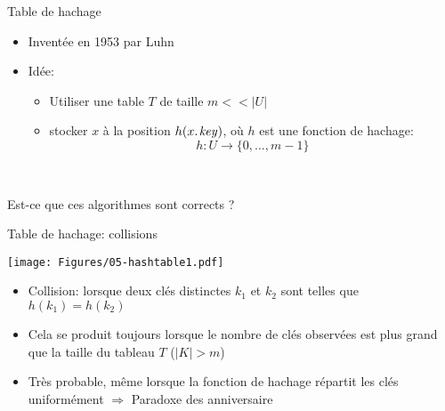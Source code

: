 \begin{frame}{Table de hachage}

\begin{itemize}
\item Inventée en 1953 par Luhn
\item Idée:
\begin{itemize}
\item Utiliser une table $T$ de taille $m<<|U|$
\item stocker $x$ à la position $h(\attrib{x}{key})$, où $h$ est une fonction de \alert{hachage}: $$h:U\rightarrow \{0,\ldots,m-1\}$$
\end{itemize}
\end{itemize}

\begin{center}
\begin{small}
~~~~~~~~

\bigskip

\end{small}
\end{center}

Est-ce que ces algorithmes sont corrects ?

\end{frame}

\begin{frame}{Table de hachage: collisions}

\centerline{\texttt{[image: Figures/05-hashtable1.pdf]}}

\bigskip

\begin{itemize}
\item \alert{Collision:} lorsque deux clés distinctes $k_1$ et $k_2$ sont telles que $h(k_1)=h(k_2)$
\item Cela se produit toujours lorsque le nombre de clés observées est plus grand que la taille du tableau $T$ ($|K|>m$)
\item Très probable, même lorsque la fonction de hachage répartit les clés uniformément $\Rightarrow$ \alert{Paradoxe des anniversaire}
\end{itemize}
\end{frame}

